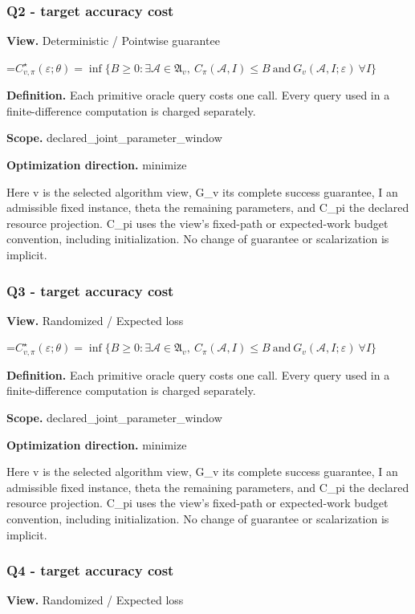 \documentclass[10pt,a4paper]{article}
\newcommand{\AtlasMath}[1]{\par\begingroup\centering\setbox0=\hbox{$\displaystyle #1$}\ifdim\wd0>1.4\linewidth\typeout{ATLAS WIDE FORMULA: \the\wd0}\fi\ifdim\wd0>\linewidth\resizebox{\linewidth}{!}{\box0}\else\box0\fi\par\endgroup}
\begin{document}
\subsubsection{Q2 - target accuracy cost}
\textbf{View.} Deterministic / Pointwise guarantee

\AtlasMath{C^\star_{v,\pi}(\varepsilon;\theta)=\inf\{B\ge0:\exists\mathcal A\in\mathfrak A_v,\ C_\pi(\mathcal A,I)\le B\ \text{and}\ G_v(\mathcal A,I;\varepsilon)\ \forall I\}}
\textbf{Definition.} Each primitive oracle query costs one call. Every query used in a finite-difference computation is charged separately.

\textbf{Scope.} declared\_joint\_parameter\_window

\textbf{Optimization direction.} minimize

Here v is the selected algorithm view, G\_v its complete success guarantee, I an admissible fixed instance, theta the remaining parameters, and C\_pi the declared resource projection. C\_pi uses the view's fixed-path or expected-work budget convention, including initialization. No change of guarantee or scalarization is implicit.

\subsubsection{Q3 - target accuracy cost}
\textbf{View.} Randomized / Expected loss

\AtlasMath{C^\star_{v,\pi}(\varepsilon;\theta)=\inf\{B\ge0:\exists\mathcal A\in\mathfrak A_v,\ C_\pi(\mathcal A,I)\le B\ \text{and}\ G_v(\mathcal A,I;\varepsilon)\ \forall I\}}
\textbf{Definition.} Each primitive oracle query costs one call. Every query used in a finite-difference computation is charged separately.

\textbf{Scope.} declared\_joint\_parameter\_window

\textbf{Optimization direction.} minimize

Here v is the selected algorithm view, G\_v its complete success guarantee, I an admissible fixed instance, theta the remaining parameters, and C\_pi the declared resource projection. C\_pi uses the view's fixed-path or expected-work budget convention, including initialization. No change of guarantee or scalarization is implicit.

\subsubsection{Q4 - target accuracy cost}
\textbf{View.} Randomized / Expected loss
\end{document}
